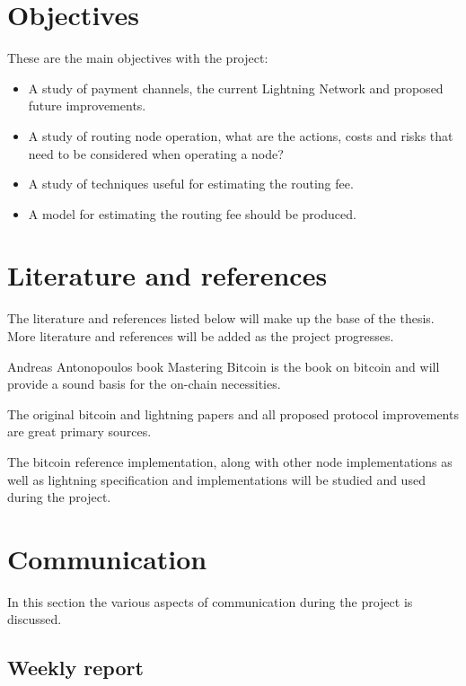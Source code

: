 \documentclass[10pt, titlepage, oneside, a4paper]{article}
\begin{document}
\section{Objectives}

These are the main objectives with the project:

\begin{itemize}
	\item A study of payment channels, the current Lightning Network and
	proposed future improvements.
	\item A study of routing node operation, what are the actions, costs and risks
	that need to be considered when operating a node?
	\item A study of techniques useful for estimating the routing fee.
	\item A model for estimating the routing fee should be produced.
\end{itemize}

\section{Literature and references}

The literature and references listed below will make up the base of the thesis. More literature and references will be added as the project progresses. 

Andreas Antonopoulos book Mastering Bitcoin\cite{antonopoulos:mastering:bitcoin} is the book on bitcoin and will provide a sound basis for the on-chain necessities.

The original bitcoin\cite{nakamoto:bitcoin} and lightning\cite{Poon:Dryja:lightning:network} papers and all proposed protocol improvements\cite{bip} are great primary sources.

The bitcoin reference implementation\cite{repository:bitcoin}, along with other node implementations\cite{repository:neutrino}\cite{repository:btcd} as well as lightning specification\cite{repository:lightning:rfc} and implementations\cite{repository:lnd}\cite{repository:clightning}\cite{repository:eclair} will be studied and used during the project.

\section{Communication}

In this section the various aspects of communication during the project is discussed.

\subsection{Weekly report}
\end{document}
